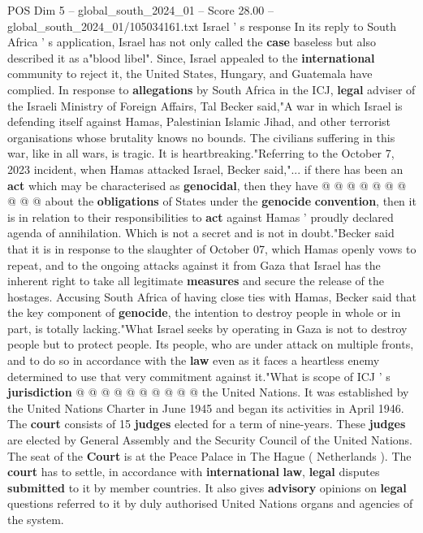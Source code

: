\begin{textsample}{POS Dim 5 – global\_south\_2024\_01 – Score 28.00 – global\_south\_2024\_01/105034161.txt}
Israel ' s response In its reply to South Africa ' s application, Israel has not only called the \textbf{case} baseless but also described it as a"blood libel".
Since, Israel appealed to the \textbf{international} community to reject it, the United States, Hungary, and Guatemala have complied.
In response to \textbf{allegations} by South Africa in the ICJ, \textbf{legal} adviser of the Israeli Ministry of Foreign Affairs, Tal Becker said,"A war in which Israel is defending itself against Hamas, Palestinian Islamic Jihad, and other terrorist organisations whose brutality knows no bounds.
The civilians suffering in this war, like in all wars, is tragic.
It is heartbreaking."Referring to the October 7, 2023 incident, when Hamas attacked Israel, Becker said,"... if there has been an \textbf{act} which may be characterised as \textbf{genocidal}, then they have @ @ @ @ @ @ @ @ @ @ about the \textbf{obligations} of States under the \textbf{genocide} \textbf{convention}, then it is in relation to their responsibilities to \textbf{act} against Hamas ' proudly declared agenda of annihilation.
Which is not a secret and is not in doubt."Becker said that it is in response to the slaughter of October 07, which Hamas openly vows to repeat, and to the ongoing attacks against it from Gaza that Israel has the inherent right to take all legitimate \textbf{measures} and secure the release of the hostages.
Accusing South Africa of having close ties with Hamas, Becker said that the key component of \textbf{genocide}, the intention to destroy people in whole or in part, is totally lacking."What Israel seeks by operating in Gaza is not to destroy people but to protect people.
Its people, who are under attack on multiple fronts, and to do so in accordance with the \textbf{law} even as it faces a heartless enemy determined to use that very commitment against it."What is scope of ICJ ' s \textbf{jurisdiction} @ @ @ @ @ @ @ @ @ @ the United Nations.
It was established by the United Nations Charter in June 1945 and began its activities in April 1946.
The \textbf{court} consists of 15 \textbf{judges} elected for a term of nine-years.
These \textbf{judges} are elected by General Assembly and the Security Council of the United Nations.
The seat of the \textbf{Court} is at the Peace Palace in The Hague ( Netherlands ).
The \textbf{court} has to settle, in accordance with \textbf{international} \textbf{law}, \textbf{legal} disputes \textbf{submitted} to it by member countries.
It also gives \textbf{advisory} opinions on \textbf{legal} questions referred to it by duly authorised United Nations organs and agencies of the system.

\end{textsample}
